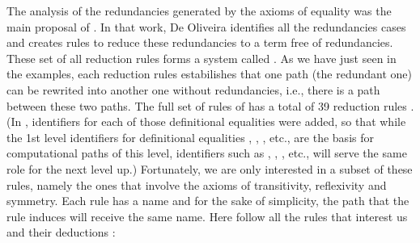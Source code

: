 \documentclass{entcs} \usepackage{entcsmacro}
\begin{document}
The analysis of the redundancies generated by the axioms of equality was the main proposal of \cite{Anjo1}. In that work, De Oliveira identifies all the redundancies cases and creates rules to reduce these redundancies to a term free of redundancies. These set of all reduction rules forms a system called . As we have just seen in the examples, each reduction rules estabilishes that one path (the redundant one) can be rewrited into another one without redundancies, i.e., there is a path between these two paths. The full set of rules of  has a total of 39 reduction rules \cite{Anjo1}. (In \cite{Ruy1}, identifiers for each of those definitional equalities were added, so that while the 1st level identifiers for definitional equalities , , , etc., are the basis for computational paths of this level, identifiers such as , , , etc., will serve the same role for the next level up.) Fortunately, we are only interested in a subset of these rules, namely the ones that involve the axioms of transitivity, reflexivity and symmetry. Each rule has a name and for the sake of simplicity, the path that the rule induces will receive the same name. Here follow all the rules that interest us and their deductions \cite{Anjo1}:
\end{document}
